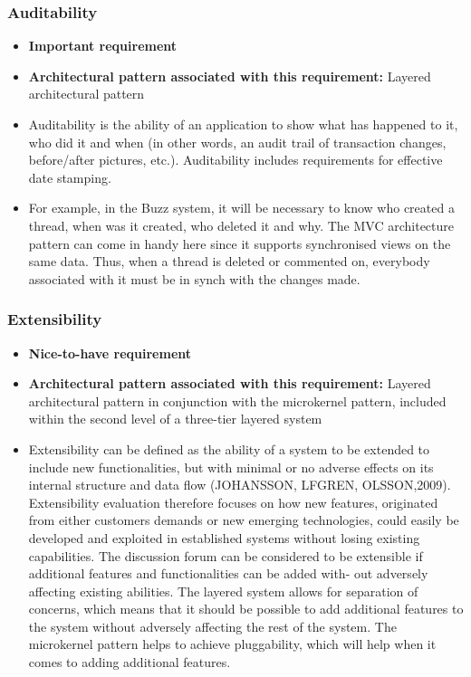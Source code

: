 \documentclass[a4paper]{article}
\begin{document}
\subsubsection{Auditability}
\begin{itemize}
	\item \textbf{Important requirement}
	\item \textbf{Architectural pattern associated with this requirement:} Layered architectural pattern 
	\item Auditability is the ability of an application to show what has happened to it, who did it and when (in other words, an audit trail of  transaction changes, before/after pictures, etc.). Auditability includes requirements for effective date stamping. 
	\item For example, in the Buzz system, it will be necessary to know who created a thread, when was it created, who deleted it and why. The MVC architecture pattern can come in handy here since it supports synchronised views on the same data. Thus, when a thread is deleted or commented on, everybody associated with it must be in synch with the changes made.
\end{itemize}


\subsubsection{Extensibility}
\begin{itemize}
	\item \textbf{Nice-to-have requirement}
	\item \textbf{Architectural pattern associated with this requirement:} Layered
	architectural pattern in conjunction with the microkernel pattern, included within the second level of a three-tier layered system
	\item Extensibility can be defined as the ability of a system to be extended to include new functionalities, but with minimal or no adverse effects on
	its internal structure and data flow (JOHANSSON, LFGREN, OLSSON,2009). Extensibility evaluation therefore focuses on how new features,
	originated from either customers demands or new emerging technologies, could easily be developed and exploited in established systems without
	losing existing capabilities. The discussion forum can be considered to be extensible if additional features and functionalities can be added with-
	out adversely affecting existing abilities. The layered system allows for separation of concerns, which means that it should be possible to add additional features to the system without adversely affecting the rest of the system. The microkernel pattern helps to achieve pluggability, which will help when it comes to adding additional features.
\end{itemize}                
           
\end{document}
